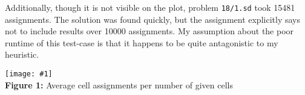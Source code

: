 \documentclass[12pt]{article}
\newcommand{\fig}[3]{
    \begin{center}
    \texttt{[image: \#1]} \\
    #2 \\
    \end{center}
}
\begin{document}
Additionally, though it is not visible on the plot, problem \texttt{18/1.sd} took 15481 assignments. The solution was
found quickly, but the assignment explicitly says not to include results over 10000 assignments. My assumption about the
poor runtime of this test-case is that it happens to be quite antagonistic to my heuristic.

\fig{sudokuplot.png}{\textbf{Figure 1:} Average cell assignments per number of given cells}{0.5}
\end{document}
